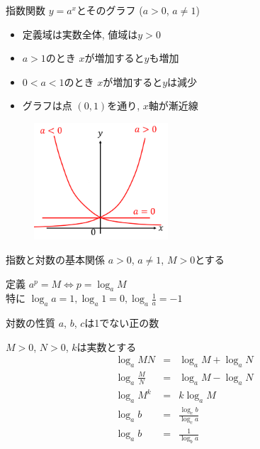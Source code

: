 \documentclass[aspectratio=169, 12pt]{beamer} %
\begin{document}
\begin{frame}{指数関数 $y=a^x$とそのグラフ ($a>0$, $a\neq 1$)}
    \begin{itemize}
        \item 定義域は実数全体, 値域は$y>0$
        \item $a>1$のとき $x$が増加すると$y$も増加
        \item $0<a<1$のとき $x$が増加すると$y$は減少
        \item グラフは点 $(0,1)$を通り, $x$軸が漸近線
    \end{itemize}
    \begin{figure}[htbp]
        \begin{center}
            \includegraphics[width=50mm]{fig/1.png}
        \end{center}
    \end{figure}
\end{frame}
\begin{frame}{指数と対数の基本関係}
    $a>0$, $a\neq 1$, $M>0$とする\par
    定義 $a^p=M \Leftrightarrow p=\log_a M $ \\
    特に $\log_a a=1, \log_a 1=0, \log_a \frac{1}{a}=-1$
\end{frame}
\begin{frame}{対数の性質}
    $a$, $b$, $c$は1でない正の数\par
    $M>0$, $N>0$, $k$は実数とする
    \begin{eqnarray*}
        \log_a MN&=&\log_a M + \log_a N \\
        \log_a \frac{M}{N}&=&\log_a M - \log_a N \\
        \log_a M^k &=& k \log_aM \\
        \log_a b &=&\frac{\log_c b}{\log_c a} \\
        \log_a b &=& \frac{1}{\log_b a}
    \end{eqnarray*}
\end{frame}
\end{document}
